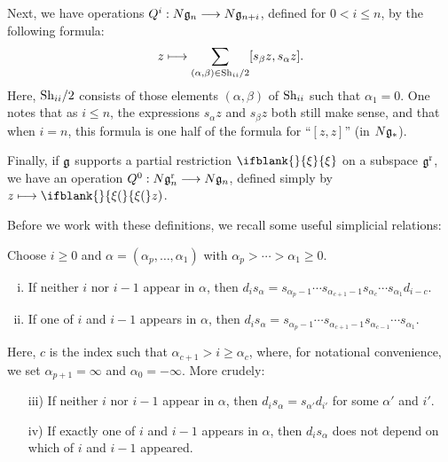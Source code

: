 \documentclass[10pt]{article}
\newcommand{\LL}[1]{\ifblank{#1}{\scrK}{\scrK^{#1}}}
\newcommand{\nontop}[1]{\ifblank{#1}{\scrU}{\scrU^{#1}}}
\newcommand{\Boverline}{\smash{\overline{B}}\rule{0mm}{\heightof{\ensuremath{B}}}}
\newcommand{\Koverline}{\smash{\overline{K}}\rule{0mm}{\heightof{\ensuremath{K}}}}
\newcommand{\Ind}[2][]{\ifblank{#1}{\mathbf{I}^{\smash{\mbox{\tiny $#2$}}}}{\mathbf{I}^{\mbox{\tiny $#2$}}_{#1}}}%
\newcommand{\BarConst}[1]{B^{\smash{\mbox{\tiny $#1$}}}}
\newcommand{\restn}[2][]{\ifblank{#1}{\xi{#2}}{\xi_{#1}{#2}}}%
\renewcommand{\Q}{Q}
\newcommand{\Shuffles}[2]{\textup{Sh}_{#1#2}}
\newcommand{\HalfShuffles}[2]{\textup{Sh}_{#1#2}/2}
\newcommand{\ModDegeneracies}[1]{(#1/\textup{Degens})}
\begin{document}
\begin{LieLambdaStructureOnKoszul}
\begin{Omitted}
Next, we have operations $\Q^i:N\frakg_n\to N\frakg_{n+i}$, defined for $0<i\leq n$, by the following formula:
\[z\mapsto \sum_{{(\alpha,\beta)\in\HalfShuffles{i}{i}}}[s_\beta z, s_\alpha z].\]
Here, $\HalfShuffles{i}{i}$ consists of those elements $(\alpha,\beta)$ of $\Shuffles{i}{i}$ such that $\alpha_1=0$.
One notes that as $i\leq n$, the expressions $s_\alpha z$ and $s_\beta z$ both still make sense, and that when $i=n$, this formula is one half of the formula for ``$[z,z]$'' (in $N\mathfrak{g}_*$).

Finally, if $\mathfrak{g}$ supports a partial restriction $\restn{}$ on a subspace $\mathfrak{g}^\textup{r}$, we have an operation $\Q^0:N\frakg^\textup{r}_n\to N\frakg_n$, defined simply by $z\mapsto\restn(z)$.
\end{Omitted}
Before we work with these definitions, we recall some useful simplicial relations:
\begin{lem}\label{LemmaOnSimplicialRelations}
Choose $i\geq0$ and $\alpha=(\alpha_p,\ldots,\alpha_1)$ with $\alpha_p>\cdots >\alpha_1\geq0$.
\begin{enumerate}[i)]\squishlist
\setlength{\parindent}{.25in}
\item If neither $i$ nor $i-1$ appear in $\alpha$, then  $d_is_\alpha=s_{\alpha_p-1}\cdots s_{\alpha_{c+1}-1}s_{\alpha_c}\cdots s_{\alpha_1}d_{i-c}$.
\item If one of $i$ and $i-1$ appears in $\alpha$, then  $d_is_\alpha=s_{\alpha_p-1}\cdots s_{\alpha_{c+1}-1}s_{\alpha_{c-1}}\cdots s_{\alpha_1}$.
\end{enumerate}
Here, $c$ is the index such that $\alpha_{c+1}>i\geq\alpha_{c}$, where, for notational convenience, we set $\alpha_{p+1}=\infty$ and $\alpha_0=-\infty$. More crudely:
\begin{enumerate}[i)]\squishlist
\setlength{\parindent}{.25in}
\item[iii)] If neither $i$ nor $i-1$ appear in $\alpha$, then  $d_is_\alpha=s_{\alpha'}d_{i'}$ for some $\alpha'$ and $i'$.
\item[iv)] If exactly one of $i$ and $i-1$ appears in $\alpha$, then  $d_is_\alpha$ does not depend on which of $i$ and $i-1$ appeared.
\end{enumerate}
\end{lem}

\end{LieLambdaStructureOnKoszul}
\end{document}
